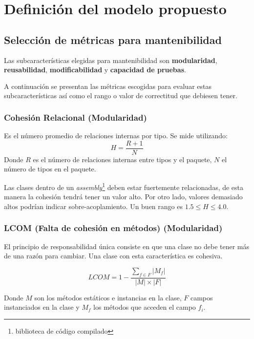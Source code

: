 \section{Definición del modelo propuesto}

\subsection{Selección de métricas para mantenibilidad}
Las subcaracterísticas elegidas para mantenibilidad son \textbf{modularidad}, \textbf{reusabilidad},
\textbf{modificabilidad} y \textbf{capacidad de pruebas}.

A continuación se presentan las métricas escogidas para evaluar estas subcaracterísticas
así como el rango o valor de correctitud que debiesen tener.

\subsubsection{Cohesión Relacional (Modularidad)}
Es el número promedio de relaciones internas por tipo. Se mide utilizando:
\begin{equation*}
H=\frac{R+1}{N}
\end{equation*}
Donde $R$ es el número de relaciones internas entre tipos y el paquete, $N$ el número de tipos en el paquete.

Las clases dentro de un \textit{assembly}\footnote{biblioteca de código compilado} deben estar fuertemente 
relacionadas, de esta manera la cohesión tendrá tener un valor alto. Por otro lado, valores demasiado altos 
podrían indicar sobre-acoplamiento. Un buen rango es $1.5\leq H\leq 4.0$.

\subsubsection{LCOM (Falta de cohesión en métodos) (Modularidad)}
El principio de responsabilidad única consiste en que una clase no debe tener más de una razón para cambiar. 
Una clase con esta característica es cohesiva.

\begin{equation*}
LCOM = 1 - \frac{\sum_{f\in F}\left|M_f\right|}{\left|M\right|\times\left|F\right|}
\end{equation*}

Donde $M$ son los métodos estáticos e instancias en la clase, $F$ campos instanciados en la clase y $M_f$ 
los métodos que acceden el campo $f_i$.

